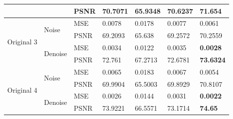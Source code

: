 \begin{center}
\begin{tabular}{llllllllllll|l|l|l|l|l|l|l|l|l|l|l|l|l|}
\multicolumn{4}{|l|}{}                            & \multicolumn{4}{l|}{}                         & \multicolumn{4}{l|}{PSNR} & \multicolumn{3}{l|}{70.7071} & \multicolumn{3}{l|}{65.9348} & \multicolumn{4}{l|}{70.6237}  & \multicolumn{3}{l|}{\textbf{71.654}}  \\ \hline
\multicolumn{4}{|l|}{\multirow{4}{*}{Original 3}} & \multicolumn{4}{l|}{\multirow{2}{*}{Noise}}   & \multicolumn{4}{l|}{MSE}  & \multicolumn{3}{l|}{0.0078}  & \multicolumn{3}{l|}{0.0178}  & \multicolumn{4}{l|}{0.0077}   & \multicolumn{3}{l|}{0.0061}           \\ \cline{9-25} 
\multicolumn{4}{|l|}{}                            & \multicolumn{4}{l|}{}                         & \multicolumn{4}{l|}{PSNR} & \multicolumn{3}{l|}{69.2093} & \multicolumn{3}{l|}{65.638}  & \multicolumn{4}{l|}{69.2572}  & \multicolumn{3}{l|}{70.2559}          \\ \cline{5-25} 
\multicolumn{4}{|l|}{}                            & \multicolumn{4}{l|}{\multirow{2}{*}{Denoise}} & \multicolumn{4}{l|}{MSE}  & \multicolumn{3}{l|}{0.0034}  & \multicolumn{3}{l|}{0.0122}  & \multicolumn{4}{l|}{0.0035}   & \multicolumn{3}{l|}{\textbf{0.0028}}  \\ \cline{9-25} 
\multicolumn{4}{|l|}{}                            & \multicolumn{4}{l|}{}                         & \multicolumn{4}{l|}{PSNR} & \multicolumn{3}{l|}{72.761}  & \multicolumn{3}{l|}{67.2713} & \multicolumn{4}{l|}{72.6781}  & \multicolumn{3}{l|}{\textbf{73.6324}} \\ \hline
\multicolumn{4}{|l|}{\multirow{4}{*}{Original 4}} & \multicolumn{4}{l|}{\multirow{2}{*}{Noise}}   & \multicolumn{4}{l|}{MSE}  & \multicolumn{3}{l|}{0.0065}  & \multicolumn{3}{l|}{0.0183}  & \multicolumn{4}{l|}{0.0067}   & \multicolumn{3}{l|}{0.0054}           \\ \cline{9-25} 
\multicolumn{4}{|l|}{}                            & \multicolumn{4}{l|}{}                         & \multicolumn{4}{l|}{PSNR} & \multicolumn{3}{l|}{69.9904} & \multicolumn{3}{l|}{65.5003} & \multicolumn{4}{l|}{69.8929}  & \multicolumn{3}{l|}{70.8107}          \\ \cline{5-25} 
\multicolumn{4}{|l|}{}                            & \multicolumn{4}{l|}{\multirow{2}{*}{Denoise}} & \multicolumn{4}{l|}{MSE}  & \multicolumn{3}{l|}{0.0026}  & \multicolumn{3}{l|}{0.0144}  & \multicolumn{4}{l|}{0.0031}   & \multicolumn{3}{l|}{\textbf{0.0022}}  \\ \cline{9-25} 
\multicolumn{4}{|l|}{}                            & \multicolumn{4}{l|}{}                         & \multicolumn{4}{l|}{PSNR} & \multicolumn{3}{l|}{73.9221} & \multicolumn{3}{l|}{66.5571} & \multicolumn{4}{l|}{73.1714}  & \multicolumn{3}{l|}{\textbf{74.65}}   \\ \hline

\end{tabular}
\end{center}
